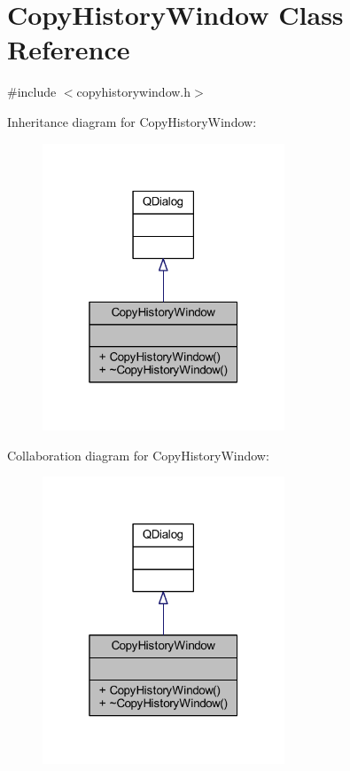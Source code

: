 \hypertarget{class_copy_history_window}{}\section{Copy\+History\+Window Class Reference}
\label{class_copy_history_window}


{\ttfamily \#include $<$copyhistorywindow.\+h$>$}



Inheritance diagram for Copy\+History\+Window\+:
\nopagebreak
\begin{figure}[H]
\begin{center}
\leavevmode
\includegraphics[width=205pt]{class_copy_history_window__inherit__graph}
\end{center}
\end{figure}


Collaboration diagram for Copy\+History\+Window\+:
\nopagebreak
\begin{figure}[H]
\begin{center}
\leavevmode
\includegraphics[width=205pt]{class_copy_history_window__coll__graph}
\end{center}
\end{figure}
